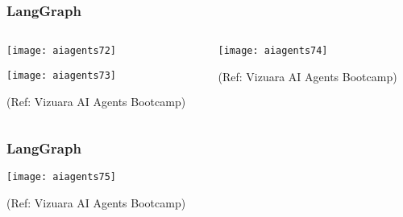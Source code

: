 \begin{frame}[fragile]\frametitle{LangGraph}
\begin{columns}
    \begin{column}[T]{0.5\linewidth}
        \begin{center}
	
        \texttt{[image: aiagents72]}
	
        \texttt{[image: aiagents73]}
		
		{\tiny (Ref: Vizuara AI Agents Bootcamp)}
				
        \end{center}    
    \end{column}
    \begin{column}[T]{0.5\linewidth}
        \begin{center}

        \texttt{[image: aiagents74]}
		
		{\tiny (Ref: Vizuara AI Agents Bootcamp)}
				
        \end{center}    
    \end{column}
  \end{columns}
\end{frame}

\begin{frame}[fragile]\frametitle{LangGraph}

        \begin{center}

        \texttt{[image: aiagents75]}
		
		{\tiny (Ref: Vizuara AI Agents Bootcamp)}
				
        \end{center}    

\end{frame}

